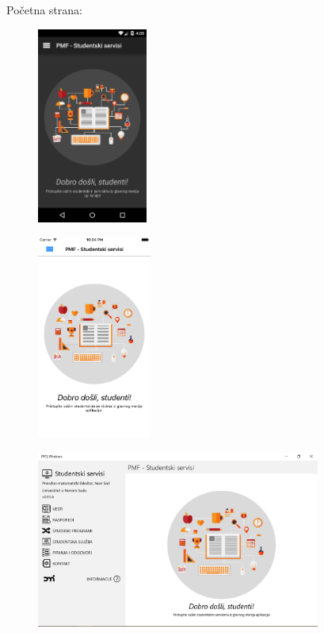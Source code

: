 \documentclass[a4paper]{article}
\begin{document}
\bigskip

Početna strana:

\begin{figure}
\centering
\includegraphics[width=36.21mm,height=64.29mm]{msc-img16.png}
\end{figure}
\begin{figure}
\centering
\includegraphics[width=37.5mm,height=66.68mm]{msc-img17.png}
\end{figure}
\begin{figure}
\centering
\includegraphics[width=93.35mm,height=58.33mm]{msc-img18.png}
\end{figure}

\bigskip


\bigskip
\end{document}
